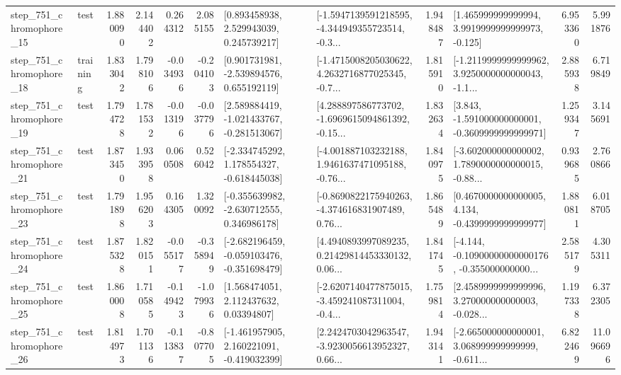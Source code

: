 \begin{tabular}{llrrrrllrlrr}
  step\_751\_chromophore\_15 &      test &      1.880090 &    2.144402 &      0.264312 &  2.085155 &     [0.893458938, 2.529943039, 0.245739217] &  [-1.5947139591218595, -4.344949355723514, -0.3... &       1.948487 &    [1.465999999999994, 3.9919999999999973, -0.125] &            6.953360 &          5.991876 \\
  step\_751\_chromophore\_18 &  training &      1.833042 &    1.798106 &     -0.034936 & -0.204103 &    [0.901731981, -2.539894576, 0.655192119] &  [-1.4715008205030622, 4.2632716877025345, -0.7... &       1.815910 &  [-1.2119999999999962, 3.9250000000000043, -1.1... &            2.885938 &          6.719849 \\
  step\_751\_chromophore\_19 &      test &      1.794728 &    1.781532 &     -0.013196 & -0.037796 &   [2.589884419, -1.021433767, -0.281513067] &  [4.288897586773702, -1.6969615094861392, -0.15... &       1.832634 &   [3.843, -1.591000000000001, -0.3609999999999971] &            1.259347 &          3.145691 \\
  step\_751\_chromophore\_21 &      test &      1.873450 &    1.933958 &      0.060508 &  0.526042 &   [-2.334745292, 1.178554327, -0.618445038] &  [-4.001887103232188, 1.9461637471095188, -0.76... &       1.840975 &  [-3.602000000000002, 1.7890000000000015, -0.88... &            0.939685 &          2.760866 \\
  step\_751\_chromophore\_23 &      test &      1.791898 &    1.956203 &      0.164305 &  1.320092 &   [-0.355639982, -2.630712555, 0.346986178] &  [-0.8690822175940263, -4.374616831907489, 0.76... &       1.865489 &   [0.4670000000000005, 4.134, -0.4399999999999977] &            1.880811 &          6.018705 \\
  step\_751\_chromophore\_24 &      test &      1.875328 &    1.820151 &     -0.055177 & -0.358949 &  [-2.682196459, -0.059103476, -0.351698479] &  [4.4940893997089235, 0.21429814453330132, 0.06... &       1.841745 &  [-4.144, -0.10900000000000176, -0.355000000000... &            2.585179 &          4.305311 \\
  step\_751\_chromophore\_25 &      test &      1.860008 &    1.710585 &     -0.149423 & -1.079936 &      [1.568474051, 2.112437632, 0.03394807] &  [-2.6207140477875015, -3.459241087311004, -0.4... &       1.759814 &  [2.4589999999999996, 3.270000000000003, -0.028... &            1.197338 &          6.372305 \\
  step\_751\_chromophore\_26 &      test &      1.814973 &    1.701136 &     -0.113837 & -0.807705 &   [-1.461957905, 2.160221091, -0.419032399] &  [2.2424703042963547, -3.9230056613952327, 0.66... &       1.943141 &  [-2.665000000000001, 3.068999999999999, -0.611... &            6.822469 &         11.096696 \\

\end{tabular}
